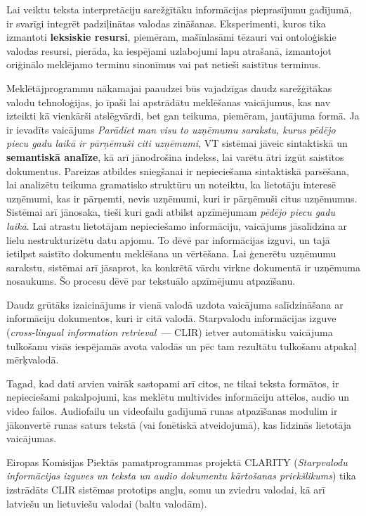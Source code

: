 \begin{multicols}{2}
Lai veiktu teksta interpretāciju sarežģītāku informācijas pieprasījumu gadījumā, ir svarīgi integrēt padziļinātas valodas zināšanas.
Eksperimenti, kuros tika izmantoti \textbf{leksiskie resursi}, piemēram, mašīnlasāmi tēzauri vai ontoloģiskie valodas resursi, pierāda, ka iespējami uzlabojumi lapu atrašanā, izmantojot oriģinālo meklējamo terminu sinonīmus vai pat netieši saistītus terminus. 


Meklētājprogrammu nākamajai paaudzei būs vajadzīgas daudz sarežģītākas valodu tehnoloģijas, jo īpaši lai apstrādātu meklēšanas vaicājumus, kas nav izteikti kā vienkārši atslēgvārdi, bet gan teikuma, piemēram, jautājuma formā.
Ja ir ievadīts vaicājums \textit{Parādiet man visu to uzņēmumu sarakstu, kurus pēdējo piecu gadu laikā ir pārņēmuši citi uzņēmumi}, VT sistēmai jāveic sintaktiskā un \textbf{semantiskā analīze}, kā arī jānodrošina indekss, lai varētu ātri izgūt saistītos dokumentus.
Pareizas atbildes sniegšanai ir nepieciešama sintaktiskā parsēšana, lai analizētu teikuma gramatisko struktūru un noteiktu, ka lietotāju interesē uzņēmumi, kas ir pārņemti, nevis uzņēmumi, kuri ir pārņēmuši citus uzņēmumus.
Sistēmai arī jānosaka, tieši kuri gadi atbilst apzīmējumam \textit{pēdējo piecu gadu laikā}.
Lai atrastu lietotājam nepieciešamo informāciju, vaicājums jāsalīdzina ar lielu nestrukturizētu datu apjomu.
To dēvē par informācijas izguvi, un tajā ietilpst saistīto dokumentu meklēšana un vērtēšana.
Lai ģenerētu uzņēmumu sarakstu, sistēmai arī jāsaprot, ka konkrētā vārdu virkne dokumentā ir uzņēmuma nosaukums.
Šo procesu dēvē par tekstuālo apzīmējumu atpazīšanu.

Daudz grūtāks izaicinājums ir vienā valodā uzdota vaicājuma salīdzināšana ar informāciju dokumentos, kuri ir citā valodā.
Starpvalodu informācijas izguve (\textit{cross-lingual information retrieval}~--- CLIR) ietver automātisku vaicājuma tulkošanu visās iespējamās avota valodās un pēc tam rezultātu tulkošanu atpakaļ mērķvalodā. 

Tagad, kad dati arvien vairāk sastopami arī citos, ne tikai teksta formātos, ir nepieciešami pakalpojumi, kas meklētu multivides informāciju attēlos, audio un video failos.
Audiofailu un videofailu gadījumā runas atpazīšanas modulim ir jākonvertē runas saturs tekstā (vai fonētiskā atveidojumā), kas līdzinās lietotāja vaicājumas. 

Eiropas Komisijas Piektās pamatprogrammas projektā CLARITY (\textit{Starpvalodu informācijas izguves un teksta un audio dokumentu kārtošanas priekšlikums}) tika izstrādāts CLIR sistēmas prototips angļu, somu un zviedru valodai, kā arī latviešu un lietuviešu valodai (baltu valodām).


\end{multicols}
